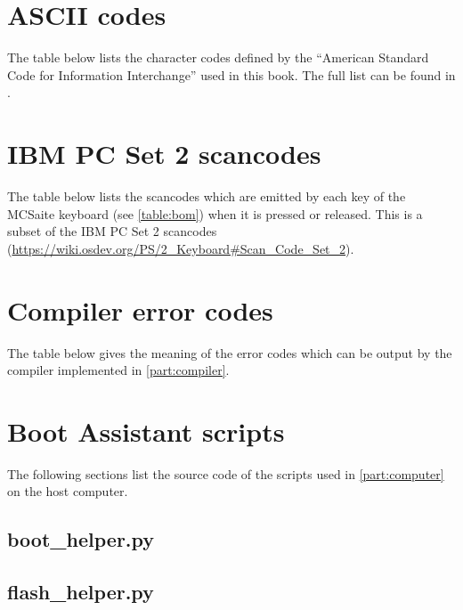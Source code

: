 \chapter{ASCII codes}\label{appendix:ascii}

The table below lists the character codes defined by the ``American Standard
Code for Information Interchange'' used in this book. The full list can be
found in \cite{ASCII}.

\begin{flushleft}
  
\end{flushleft}

\chapter{IBM PC Set 2 scancodes}\label{appendix:scancodes}

The table below lists the scancodes which are emitted by each key of the
MCSaite keyboard (see \cref{table:bom}) when it is pressed or released. This is
a subset of the IBM PC Set 2 scancodes
(\url{https://wiki.osdev.org/PS/2_Keyboard#Scan_Code_Set_2}).

\begin{flushleft}
  
\end{flushleft}

\chapter{Compiler error codes}\label{appendix:compilercodes}

The table below gives the meaning of the error codes which can be output by the
compiler implemented in \cref{part:compiler}.

\begin{flushleft}
  
\end{flushleft}

\chapter{Boot Assistant scripts}\label{appendix:python-scripts}

The following sections list the source code of the scripts used in
\cref{part:computer} on the host computer.

\section{boot\_helper.py}

\bigskip


\section{flash\_helper.py}

\bigskip

